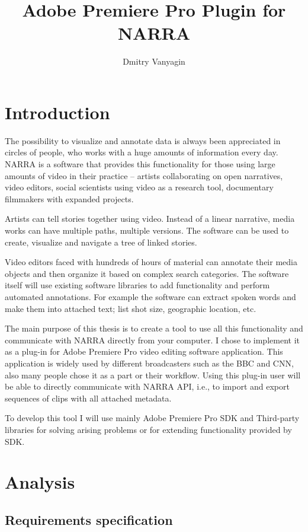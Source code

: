 \documentclass[thesis=B,english]{FITthesis}[2012/10/20]
\title{Adobe Premiere Pro Plugin for NARRA}
\author{Dmitry Vanyagin} %
\begin{document}

\chapter{Introduction}
The possibility to visualize and annotate data is always been appreciated in circles of people, who works with a huge amounts of information every day. NARRA is a software that provides this functionality for those using large amounts of video in their practice – artists collaborating on open narratives, video editors, social scientists using video as a research tool, documentary filmmakers with expanded projects. 

Artists can tell stories together using video. Instead of a linear narrative, media works can have multiple paths, multiple versions. The software can be used to create, visualize and navigate a tree of linked stories.

Video editors faced with hundreds of hours of material can annotate their media objects and then organize it based on complex search categories. The software itself will use existing software libraries to add functionality and perform automated annotations. For example the software can extract spoken words and make them into attached text; list shot size, geographic location, etc.

The main purpose of this thesis is to create a tool to use all this functionality and communicate with NARRA directly from your computer. I chose to implement it as a plug-in for Adobe Premiere Pro video editing software application. This application is widely used by different broadcasters such as the BBC\cite{bbc} and CNN\cite{cnn}, also many people chose it as a part or their workflow. Using this plug-in user will be able to directly communicate with NARRA API, i.e., to import and export sequences of clips with all attached metadata. 

To develop this tool I will use mainly Adobe Premiere Pro SDK and Third-party libraries for solving arising problems or for extending functionality provided by SDK.
\chapter{Analysis}
\section{Requirements specification}
\end{document}
